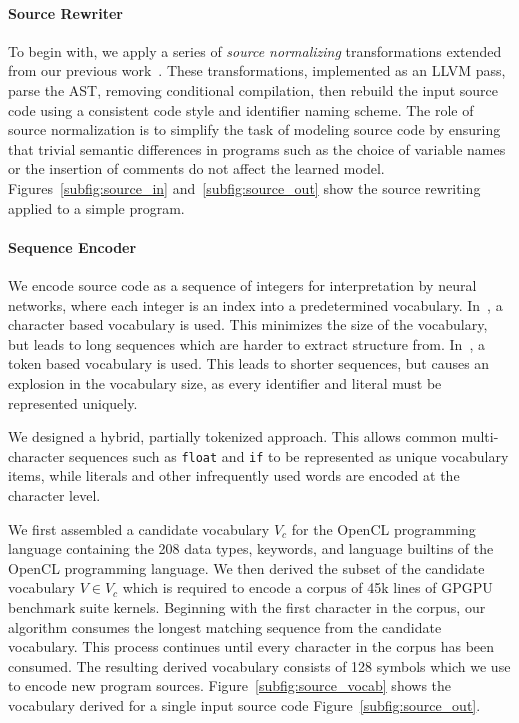 \paragraph{Source Rewriter} To begin with, we apply a series of \emph{source normalizing} transformations extended from our previous work~\cite{Cummins2017a}. These transformations, implemented as an LLVM pass, parse the AST, removing conditional compilation, then rebuild the input source code using a consistent code style and identifier naming scheme. The role of source normalization is to simplify the task of modeling source code by ensuring that trivial semantic differences in programs such as the choice of variable names or the insertion of comments do not affect the learned model. Figures~\ref{subfig:source_in} and~\ref{subfig:source_out} show the source rewriting applied to a simple program.

\paragraph{Sequence Encoder}  We encode source code as a sequence of integers for interpretation by neural networks, where each integer is an index into a predetermined vocabulary. In~\cite{Cummins2017a}, a character based vocabulary is used. This minimizes the size of the vocabulary, but leads to long sequences which are harder to extract structure from. In~\cite{Allamanis2013a}, a token based vocabulary is used. This leads to shorter sequences, but causes an explosion in the vocabulary size, as every identifier and literal must be represented uniquely.

We designed a hybrid, partially tokenized approach. This allows common multi-character sequences such as \texttt{float} and \texttt{if} to be represented as unique vocabulary items, while literals and other infrequently used words are encoded at the character level.

We first assembled a candidate vocabulary $V_c$ for the OpenCL programming language containing the 208 data types, keywords, and language builtins of the OpenCL programming language. We then derived the subset of the candidate vocabulary $V \in V_c$ which is required to encode a corpus of 45k lines of GPGPU benchmark suite kernels. Beginning with the first character in the corpus, our algorithm consumes the longest matching sequence from the candidate vocabulary. This process continues until every character in the corpus has been consumed. The resulting derived vocabulary consists of 128 symbols which we use to encode new program sources. Figure~\ref{subfig:source_vocab} shows the vocabulary derived for a single input source code Figure~\ref{subfig:source_out}.

